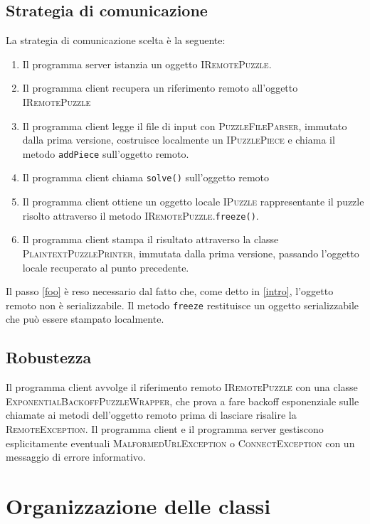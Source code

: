 \documentclass[a4paper]{article}
\newcommand{\Classname}[1]{\textsc{#1}}
\newcommand{\Ifacename}[1]{\textsc{#1}}
\newcommand{\Methodname}[1]{\texttt{#1}}
\begin{document}
\subsection{Strategia di comunicazione}
La strategia di comunicazione scelta \`e la seguente:
\begin{enumerate}
\item Il programma server istanzia un oggetto \Ifacename{IRemotePuzzle}.
\item Il programma client recupera un riferimento remoto all'oggetto \Ifacename{IRemotePuzzle}
\item Il programma client legge il file di input con \Classname{PuzzleFileParser}, immutato dalla prima versione, costruisce localmente un \Ifacename{IPuzzlePiece} e chiama il metodo \Methodname{addPiece} sull'oggetto remoto.
\item Il programma client chiama \Methodname{solve()} sull'oggetto remoto
\item \label{foo} Il programma client ottiene un oggetto locale \Ifacename{IPuzzle} rappresentante il puzzle risolto attraverso il metodo \Ifacename{IRemotePuzzle}.\Methodname{freeze()}.
\item Il programma client stampa il risultato attraverso la classe \Classname{PlaintextPuzzlePrinter}, immutata dalla prima versione, passando l'oggetto locale recuperato al punto precedente.
\end{enumerate}

Il passo \ref{foo} \`e reso necessario dal fatto che, come detto in \ref{intro}, l'oggetto remoto non \`e serializzabile.
Il metodo \Methodname{freeze} restituisce un oggetto serializzabile che pu\`o essere stampato localmente.

\subsection{Robustezza}
Il programma client avvolge il riferimento remoto \Ifacename{IRemotePuzzle} con una classe \Classname{ExponentialBackoffPuzzleWrapper}, che prova a fare backoff esponenziale sulle chiamate ai metodi dell'oggetto remoto prima di lasciare risalire la \Classname{RemoteException}.
Il programma client e il programma server gestiscono esplicitamente eventuali \Classname{MalformedUrlException} o \Classname{ConnectException} con un messaggio di errore informativo.
\section{Organizzazione delle classi}
\end{document}
